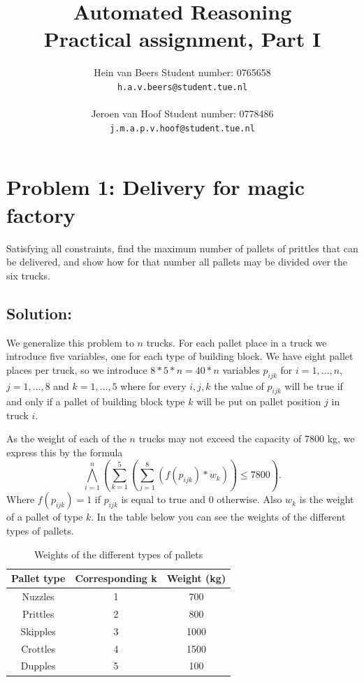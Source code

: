 \documentclass[a4paper]{article}
\author{Hein van Beers \qquad Student number: 0765658 \\{\tt h.a.v.beers@student.tue.nl}\\ \\ Jeroen van Hoof \qquad Student number: 0778486 \\{\tt j.m.a.p.v.hoof@student.tue.nl}}
\title{Automated Reasoning\\
	 \large Practical assignment, Part I}
\begin{document}
	\maketitle
	
	\section*{Problem 1: Delivery for magic factory}
	Satisfying all constraints, find the maximum number of pallets of prittles that can be delivered, and show how for that number all pallets may be divided over the six trucks.

	
	\subsection*{Solution:}
	We generalize this problem to $n$ trucks. For each pallet place in a truck we introduce five variables, one for each type of building block. We have eight pallet places per truck, so we introduce $8*5*n = 40*n$ variables $p_{ijk}$ for $i = 1,\ldots,n$, $j = 1,\ldots,8$ and $k = 1,\ldots,5$ where for every $i,j,k$ the value of $p_{ijk}$ will be true if and only if a pallet of building block type $k$ will be put on pallet position $j$ in truck $i$.
	
	As the weight of each of the $n$ trucks may not exceed the capacity of 7800 kg, we express this by the formula
\[ \bigwedge_{i=1}^n (\sum_{k=1}^5 (\sum_{j=1}^8 (f(p_{ijk})*w_k)) \leq 7800).\]
Where $f(p_{ijk}) = 1$ if $p_{ijk}$ is equal to true and 0 otherwise. Also $w_k$ is the weight of a pallet of type $k$. In the table below you can see the weights of the different types of pallets.

\begin{table}[H]
\centering
\caption{Weights of the different types of pallets}
\label{my-label}
\begin{tabular}{c|c|c}
\textbf{Pallet type} & \textbf{Corresponding k} & \textbf{Weight (kg)} \\ \hline
Nuzzles              & 1                        & 700                  \\ \hline
Prittles             & 2                        & 800                  \\ \hline
Skipples             & 3                        & 1000                 \\ \hline
Crottles             & 4                        & 1500                 \\ \hline
Dupples              & 5                        & 100                 
\end{tabular}
\end{table}
\end{document}
